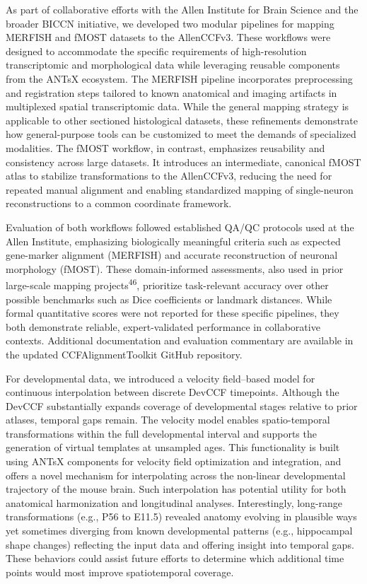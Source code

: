 \documentclass[
  12pt,
]{article}
\begin{document}
As part of collaborative efforts with the Allen Institute for Brain
Science and the broader BICCN initiative, we developed two modular
pipelines for mapping MERFISH and fMOST datasets to the AllenCCFv3.
These workflows were designed to accommodate the specific requirements
of high-resolution transcriptomic and morphological data while
leveraging reusable components from the ANTsX ecosystem. The MERFISH
pipeline incorporates preprocessing and registration steps tailored to
known anatomical and imaging artifacts in multiplexed spatial
transcriptomic data. While the general mapping strategy is applicable to
other sectioned histological datasets, these refinements demonstrate how
general-purpose tools can be customized to meet the demands of
specialized modalities. The fMOST workflow, in contrast, emphasizes
reusability and consistency across large datasets. It introduces an
intermediate, canonical fMOST atlas to stabilize transformations to the
AllenCCFv3, reducing the need for repeated manual alignment and enabling
standardized mapping of single-neuron reconstructions to a common
coordinate framework.

Evaluation of both workflows followed established QA/QC protocols used
at the Allen Institute, emphasizing biologically meaningful criteria
such as expected gene-marker alignment (MERFISH) and accurate
reconstruction of neuronal morphology (fMOST). These domain-informed
assessments, also used in prior large-scale mapping
projects\textsuperscript{46}, prioritize task-relevant accuracy over
other possible benchmarks such as Dice coefficients or landmark
distances. While formal quantitative scores were not reported for these
specific pipelines, they both demonstrate reliable, expert-validated
performance in collaborative contexts. Additional documentation and
evaluation commentary are available in the updated CCFAlignmentToolkit
GitHub repository.

For developmental data, we introduced a velocity field--based model for
continuous interpolation between discrete DevCCF timepoints. Although
the DevCCF substantially expands coverage of developmental stages
relative to prior atlases, temporal gaps remain. The velocity model
enables spatio-temporal transformations within the full developmental
interval and supports the generation of virtual templates at unsampled
ages. This functionality is built using ANTsX components for velocity
field optimization and integration, and offers a novel mechanism for
interpolating across the non-linear developmental trajectory of the
mouse brain. Such interpolation has potential utility for both
anatomical harmonization and longitudinal analyses. Interestingly,
long-range transformations (e.g., P56 to E11.5) revealed anatomy
evolving in plausible ways yet sometimes diverging from known
developmental patterns (e.g., hippocampal shape changes) reflecting the
input data and offering insight into temporal gaps. These behaviors
could assist future efforts to determine which additional time points
would most improve spatiotemporal coverage.
\end{document}
